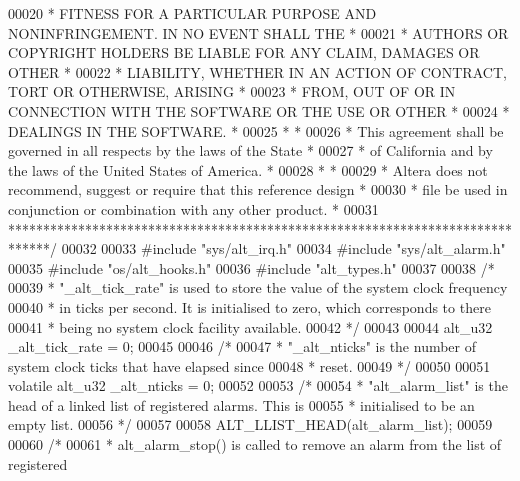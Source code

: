 \begin{DoxyCode}
00020 \textcolor{comment}{* FITNESS FOR A PARTICULAR PURPOSE AND NONINFRINGEMENT. IN NO EVENT SHALL THE *}
00021 \textcolor{comment}{* AUTHORS OR COPYRIGHT HOLDERS BE LIABLE FOR ANY CLAIM, DAMAGES OR OTHER      *}
00022 \textcolor{comment}{* LIABILITY, WHETHER IN AN ACTION OF CONTRACT, TORT OR OTHERWISE, ARISING     *}
00023 \textcolor{comment}{* FROM, OUT OF OR IN CONNECTION WITH THE SOFTWARE OR THE USE OR OTHER         *}
00024 \textcolor{comment}{* DEALINGS IN THE SOFTWARE.                                                   *}
00025 \textcolor{comment}{*                                                                             *}
00026 \textcolor{comment}{* This agreement shall be governed in all respects by the laws of the State   *}
00027 \textcolor{comment}{* of California and by the laws of the United States of America.              *}
00028 \textcolor{comment}{*                                                                             *}
00029 \textcolor{comment}{* Altera does not recommend, suggest or require that this reference design    *}
00030 \textcolor{comment}{* file be used in conjunction or combination with any other product.          *}
00031 \textcolor{comment}{******************************************************************************/}
00032 
00033 \textcolor{preprocessor}{#include "sys/alt_irq.h"}
00034 \textcolor{preprocessor}{#include "sys/alt_alarm.h"}
00035 \textcolor{preprocessor}{#include "os/alt_hooks.h"}
00036 \textcolor{preprocessor}{#include "alt_types.h"}
00037 
00038 \textcolor{comment}{/*}
00039 \textcolor{comment}{ * "\_alt\_tick\_rate" is used to store the value of the system clock frequency}
00040 \textcolor{comment}{ * in ticks per second. It is initialised to zero, which corresponds to there}
00041 \textcolor{comment}{ * being no system clock facility available. }
00042 \textcolor{comment}{ */}
00043 
00044 alt_u32 _alt_tick_rate = 0;
00045 
00046 \textcolor{comment}{/*}
00047 \textcolor{comment}{ * "\_alt\_nticks" is the number of system clock ticks that have elapsed since}
00048 \textcolor{comment}{ * reset. }
00049 \textcolor{comment}{ */}
00050 
00051 \textcolor{keyword}{volatile} alt_u32 _alt_nticks = 0;
00052 
00053 \textcolor{comment}{/*}
00054 \textcolor{comment}{ * "alt\_alarm\_list" is the head of a linked list of registered alarms. This is}
00055 \textcolor{comment}{ * initialised to be an empty list.}
00056 \textcolor{comment}{ */}
00057 
00058 ALT_LLIST_HEAD(alt_alarm_list);
00059 
00060 \textcolor{comment}{/*}
00061 \textcolor{comment}{ * alt\_alarm\_stop() is called to remove an alarm from the list of registered }

\end{DoxyCode}
